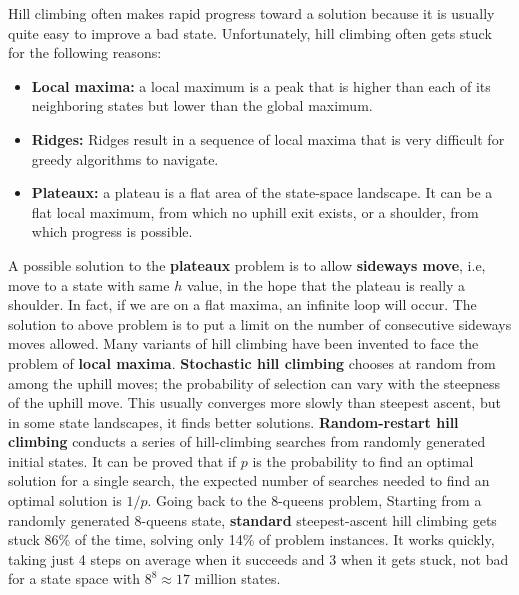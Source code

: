Hill climbing often makes rapid progress toward a solution because it is usually quite easy to improve a bad state. Unfortunately, hill climbing often gets stuck for the following reasons:
\begin{itemize}
    \item \textbf{Local maxima:}  a local maximum is a peak that is higher than each of its neighboring states but lower than the global maximum.

    \item \textbf{Ridges:} Ridges result in a sequence of local maxima that is very difficult for greedy algorithms to navigate.

    \item \textbf{Plateaux:} a plateau is a flat area of the state-space landscape. It can be a flat local maximum, from which no uphill exit exists, or a shoulder, from which progress is possible.
\end{itemize}
A possible solution to the \textbf{plateaux} problem is to allow \textbf{sideways move}, i.e, move to a state with same $h$ value, in the hope that the plateau is really a shoulder. In fact, if we are on a flat maxima, an infinite loop will occur. The solution to above problem is to put a limit on the number of consecutive sideways moves allowed.\newline\newline
Many variants of hill climbing have been invented to face the problem of \textbf{local maxima}. \textbf{Stochastic hill climbing} chooses at
random from among the uphill moves; the probability of selection can vary with the steepness of the uphill move. This usually converges more slowly than steepest ascent, but in some state landscapes, it finds better solutions. \textbf{Random-restart hill climbing} conducts a series of hill-climbing searches from randomly generated initial states. It can be proved that if $p$ is the probability to find an optimal solution for a single
search, the expected number of searches needed to find an optimal solution is $1/p$.\newline\newline
Going back to the 8-queens problem, Starting from a randomly generated 8-queens state, \textbf{standard} steepest-ascent hill climbing gets stuck 86\% of the time, solving only 14\% of problem instances.  It works quickly, taking just 4 steps on average when it succeeds and 3 when it gets stuck, not bad for a state space with $8^8 \approx 17$ million states.\newline\newline
